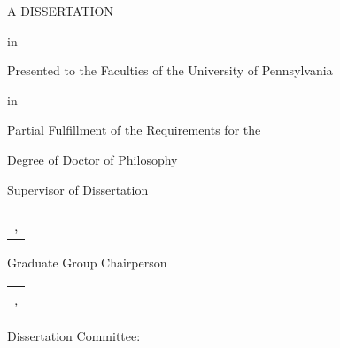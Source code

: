 \begin{titlepage}
	\thispagestyle{empty} %
	\begin{center}

	\onehalfspacing

	\mytitle

	\myauthor

	A DISSERTATION

	in 

	\mydepartment 


	Presented to the Faculties of the University of Pennsylvania

	in 

	Partial Fulfillment of the Requirements for the

	Degree of Doctor of Philosophy

	\myyear

	\end{center}

	\vfill %

	\begin{flushleft}

	Supervisor of Dissertation\\[\signatures] %

	\renewcommand{\tabcolsep}{0 pt}
	\begin{table}[h]
	\begin{tabularx}{\maxlen}{l}
	\toprule
	\mysupervisorname, \mysupervisortitle\\ %
	\end{tabularx}
	\end{table}

	Graduate Group Chairperson\\[\signatures] %

	\begin{table}[h]
	\begin{tabularx}{\maxlen}{l}
	\toprule
	\gradchairname, \gradchairtitle\\ %
	\end{tabularx}
	\end{table}
	\singlespacing

	Dissertation Committee: %

	\mycommittee

	\end{flushleft}
\end{titlepage}

